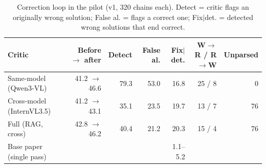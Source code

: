\begin{table}[t]
\centering
\footnotesize
\caption{Correction loop in the pilot (v1, 320 chains each). Detect = critic flags an originally wrong solution; False al. = flags a correct one; Fix$|$det. = detected wrong solutions that end correct.}
\label{tab:corr}
\setlength{\tabcolsep}{3.5pt}
\begin{tabular}{lrrrrrr}
\toprule
Critic & Before $\to$ after & Detect & False al. & Fix$|$det. & W$\to$R / R$\to$W & Unparsed \\
\midrule
Same-model (Qwen3-VL) & 41.2 $\to$ 46.6 & 79.3 & 53.0 & 16.8 & 25 / 8 & 0 \\
Cross-model (InternVL3.5) & 41.2 $\to$ 43.1 & 35.1 & 23.5 & 19.7 & 13 / 7 & 76 \\
Full (RAG, cross) & 42.8 $\to$ 46.2 & 40.4 & 21.2 & 20.3 & 15 / 4 & 76 \\
Base paper (single pass) &  &  &  & 1.1--5.2 &  &  \\
\bottomrule
\end{tabular}
\end{table}
